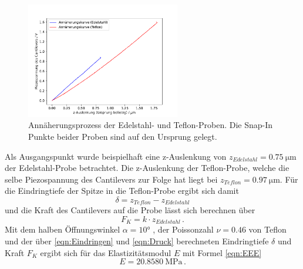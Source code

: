         \begin{figure}
            \centering
            \includegraphics[width = 0.60\textwidth]{pictures/Ursprung.pdf}
            \caption{Annäherungsprozess der Edelstahl- und Teflon-Proben. Die Snap-In Punkte beider Proben sind auf den Ursprung gelegt.}
            \label{fig:Ela}
        \end{figure}
        Als Ausgangspunkt wurde beispielhaft eine z-Auslenkung von $z_{Edelstahl}=\SI{0.75}{\micro\metre}$ der Edelstahl-Probe betrachtet. Die z-Auslenkung der Teflon-Probe, welche die selbe Piezospannung des Cantilevers zur Folge hat liegt bei $z_{Teflon}=\SI{0.97}{\micro\metre}$. Für die Eindringtiefe der Spitze in die Teflon-Probe ergibt sich damit
        \begin{equation}
            \delta = z_{Teflon} - z_{Edelstahl}
            \label{eqn:Eindringen}
        \end{equation}
        und die Kraft des Cantilevers auf die Probe lässt sich berechnen über
        \begin{equation}
            F_K = k\cdot z_{Edelstahl} \, .
            \label{eqn:Druck}
        \end{equation}
        Mit dem halben Öffnungswinkel $\alpha = 10°$ \cite{tu_dortmund_versuchsanleitung_nodate}, der Poissonzahl $\nu = 0.46$ von Teflon \cite{DuPont} und der über \ref{eqn:Eindringen} und \ref{eqn:Druck} berechneten Eindringtiefe $\delta$ und Kraft $F_K$ ergibt sich für das Elastizitätsmodul $E$ mit Formel \ref{eqn:EEE}
        \begin{equation}
            E = \SI{20.8580}{\mega\pascal} \, .
        \end{equation}

